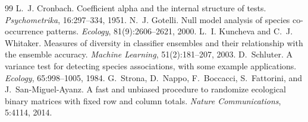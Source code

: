 \documentclass{article}
\begin{document}
\begin{thebibliography}{99}
\small
{} L.~J. Cronbach. Coefficient alpha and the internal structure of tests. \emph{Psychometrika}, 16:297--334, 1951.
 N.~J. Gotelli. Null model analysis of species co-occurrence patterns. \emph{Ecology}, 81(9):2606--2621, 2000.
 L.~I. Kuncheva and C.~J. Whitaker. Measures of diversity in classifier ensembles and their relationship with the ensemble accuracy. \emph{Machine Learning}, 51(2):181--207, 2003.
 D.~Schluter. A variance test for detecting species associations, with some example applications. \emph{Ecology}, 65:998--1005, 1984.
 G.~Strona, D.~Nappo, F.~Boccacci, S.~Fattorini, and J.~San-Miguel-Ayanz. A fast and unbiased procedure to randomize ecological binary matrices with fixed row and column totals. \emph{Nature Communications}, 5:4114, 2014.
\end{thebibliography}
\end{document}
